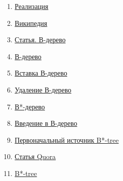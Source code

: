 \begin{enumerate}
        \item \href{https://habr.com/ru/post/337594/}{Реализация}
        \item \href{https://en.wikipedia.org/wiki/B-tree}{Википедия}
        \item \href{https://byjus.com/gate/b-plus-tree-in-dbms-notes/}{Статья. В-дерево}
        \item \href{https://www.programiz.com/dsa/b-tree}{В-дерево}
        \item \href{https://www.programiz.com/dsa/insertion-into-a-b-tree#cpp-code}{Вставка В-дерево}
        \item \href{https://www.programiz.com/dsa/deletion-from-a-b-tree}{Удаление В-дерево}
        \item \href{https://www.geeksforgeeks.org/b-trees-implementation-in-c}{В*-дерево}
        \item \href{https://www.geeksforgeeks.org/introduction-of-b-tree-2/}{Введение в В-дерево}
        \item \href{file:///D:/%D0%B7%D0%B0%D0%B3%D1%80%D1%83%D0%B7%D0%BA%D0%B8/ADA059391.pdf}{Первоначальный источник B*-tree}
        \item \href{https://www.quora.com/What-are-B*trees}{Статья Quora}
        \item \href{https://prettyneatcode.wordpress.com/2014/08/05/b-star-tree-b/}{B*-tree}
    \end{enumerate}


